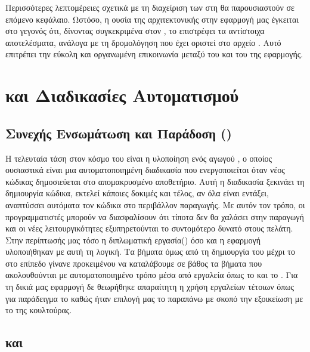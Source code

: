 Περισσότερες λεπτομέρειες σχετικά με τη διαχείριση των  στη  θα παρουσιαστούν σε επόμενο κεφάλαιο. Ωστόσο, η ουσία της αρχιτεκτονικής  στην εφαρμογή μας έγκειται στο γεγονός ότι, δίνοντας συγκεκριμένα  στον , το  επιστρέφει τα αντίστοιχα αποτελέσματα, ανάλογα με τη δρομολόγηση που έχει οριστεί στο αρχείο . Αυτό επιτρέπει την εύκολη και οργανωμένη επικοινωνία μεταξύ του  και του  της εφαρμογής.

\section{ και Διαδικασίες Αυτοματισμού}

\subsection{Συνεχής Ενσωμάτωση και Παράδοση () }

Η τελευταία τάση στον κόσμο του  είναι η υλοποίηση ενός αγωγού , ο οποίος ουσιαστικά
είναι μια αυτοματοποιημένη διαδικασία που ενεργοποιείται όταν νέος κώδικας δημοσιεύεται στο
απομακρυσμένο αποθετήριο. Αυτή η διαδικασία ξεκινάει τη δημιουργία κώδικα, εκτελεί κάποιες δοκιμές και
τέλος, αν όλα είναι εντάξει, αναπτύσσει αυτόματα τον κώδικα στο
περιβάλλον παραγωγής. Με αυτόν τον τρόπο, οι προγραμματιστές μπορούν να διασφαλίσουν ότι τίποτα δεν θα χαλάσει
στην παραγωγή και οι νέες λειτουργικότητες εξυπηρετούνται το συντομότερο δυνατό στους
πελάτη. Στην περίπτωσής μας τόσο η διπλωματική εργασία() όσο και η εφαρμογή υλοποιήθηκαν με αυτή τη λογική. Τα βήματα όμως
από τη δημιουργία του  μέχρι το  στο  επίπεδο γίνανε  προκειμένου να καταλάβουμε σε βάθος 
τα βήματα που ακολουθούνται με αυτοματοποιημένο τρόπο μέσα από εργαλεία όπως το  και το . Για τη δικιά μας εφαρμογή δε θεωρήθηκε απαραίτητη η χρήση εργαλείων  τέτοιων όπως για παράδειγμα το  καθώς ήταν επιλογή μας
το παραπάνω με σκοπό την εξοικείωση με το  της  κουλτούρας.



\subsection{ και }

